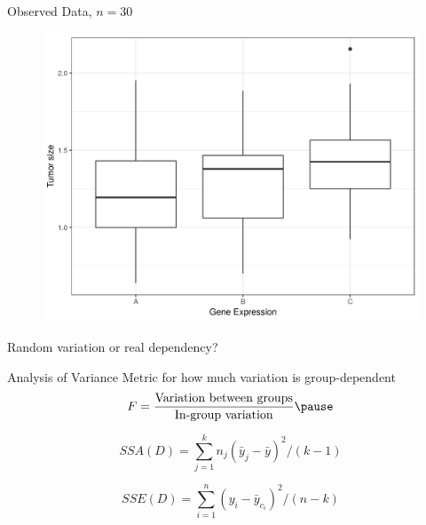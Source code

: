 \documentclass{beamer}
\newcommand{\sse}{\textit{SSE}\xspace}
\newcommand{\ssa}{\textit{SSA}\xspace}
\begin{document}
\begin{frame}{Observed Data, $n=30$}
\pause
\begin{figure}
  \includegraphics[scale=0.5]{simulation/observed-plot}
\end{figure}
\pause
Random variation or real dependency?
\end{frame}

\begin{frame}{Analysis of Variance}
\pause
Metric for how much variation is group-dependent 
\begin{equation*}
F = \frac{\text{Variation between groups}}{\text{In-group variation}} \pause 
\end{equation*}

\begin{equation*}
\ssa(D) = \sum_{j=1}^{k} n_j (\bar{y}_j - \bar{y})^2/(k-1)
\end{equation*}

\begin{equation*}
\sse(D) = \sum_{i=1}^{n}  (y_{i}-\bar{y}_{c_i})^2/(n-k)
\end{equation*}
\end{frame}
\end{document}
